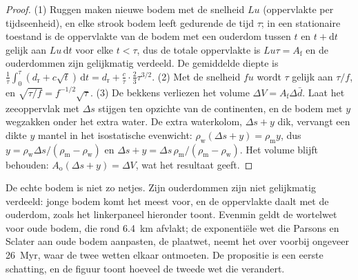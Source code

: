 \begin{proof}
(1) Ruggen maken nieuwe bodem met de snelheid $Lu$ (oppervlakte per tijdseenheid), en elke strook bodem leeft
gedurende de tijd $\tau$; in een stationaire toestand is de oppervlakte van de bodem met een ouderdom tussen $t$ en $t + \mathrm{d}t$
gelijk aan $Lu\,\mathrm{d}t$ voor elke $t < \tau$, dus de totale oppervlakte is $Lu\tau = A_{\text{f}}$ en de
ouderdommen zijn gelijkmatig verdeeld. De gemiddelde diepte is
$\frac1\tau\int_0^\tau (d_{\text{r}} + c\sqrt t)\,\mathrm{d}t = d_{\text{r}} + \frac{c}{\tau}
\cdot\frac23\tau^{3/2}$. (2) Met de snelheid $fu$ wordt $\tau$ gelijk aan $\tau/f$, en
$\sqrt{\tau/f} = f^{-1/2}\sqrt\tau$. (3) De bekkens verliezen het volume $\Delta V = A_{\text{f}}
\Delta\bar d$. Laat het zeeoppervlak met $\Delta s$ stijgen ten opzichte van de continenten, en de bodem
met $y$ wegzakken onder het extra water. De extra waterkolom, $\Delta s + y$ dik, vervangt een
dikte $y$ mantel in het isostatische evenwicht: $\rho_{\text{w}}(\Delta s + y) =
\rho_{\text{m}} y$, dus $y = \rho_{\text{w}}\Delta s/(\rho_{\text{m}} - \rho_{\text{w}})$ en
$\Delta s + y = \Delta s\,\rho_{\text{m}}/(\rho_{\text{m}} - \rho_{\text{w}})$. Het volume blijft
behouden: $A_{\text{o}}(\Delta s + y) = \Delta V$, wat het resultaat geeft.
\end{proof}

De echte bodem is niet zo netjes. Zijn ouderdommen zijn niet gelijkmatig verdeeld: jonge bodem komt het meest voor,
en de oppervlakte daalt met de ouderdom, zoals het linkerpaneel hieronder toont. Evenmin geldt de wortelwet voor
oude bodem, die rond \qty{6.4}{km} afvlakt; de exponentiële wet die Parsons en Sclater
aan oude bodem aanpasten, de plaatwet, neemt het over voorbij ongeveer \qty{26}{Myr}, waar de twee wetten
elkaar ontmoeten. De propositie is een eerste schatting, en de figuur
toont hoeveel de tweede wet die verandert.

